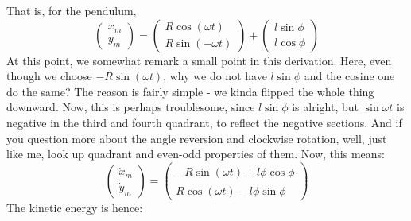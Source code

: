 That is, for the pendulum, 
\begin{equation}
    \begin{pmatrix}
        x_{m} \\
        y_{m}
    \end{pmatrix}
    = 
    \begin{pmatrix}
        R\cos{(\omega t)}\\
        R\sin{(-\omega t)}
    \end{pmatrix}
    + \begin{pmatrix}
        l\sin{\phi}\\
        l\cos{\phi}
    \end{pmatrix}
\end{equation}
At this point, we somewhat remark a small point in this derivation. Here, even though we choose $-R\sin{(\omega t)}$, why we do not have $l\sin{\phi}$ and the cosine one do the same? The reason is fairly simple - we kinda flipped the whole thing downward. Now, this is perhaps troublesome, since $l\sin{\phi}$ is alright, but $\sin{\omega t}$ is negative in the third and fourth quadrant, to reflect the negative sections. And if you question more about the angle reversion and clockwise rotation, well, just like me, look up quadrant and even-odd properties of them. Now, this means: 
\begin{equation}
    \begin{pmatrix}
        \dot{x}_{m}\\
        \dot{y}_{m}
    \end{pmatrix}
    = 
    \begin{pmatrix}
        - R \sin{(\omega t)} + l \dot{\phi} \cos{\phi}\\
        R\cos{(\omega t)} - l \dot{\phi}\sin{\phi}
    \end{pmatrix}
\end{equation}
The kinetic energy is hence: 
